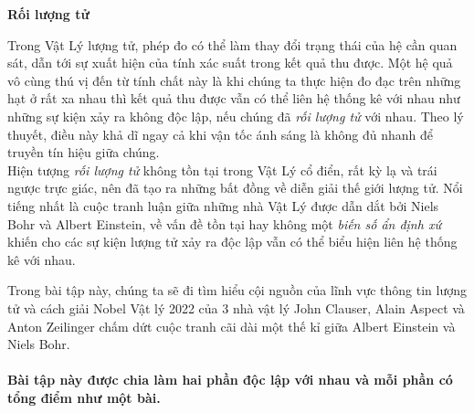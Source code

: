 
\textbf{Rối lượng tử}

Trong Vật Lý lượng tử, phép đo có thể làm thay đổi trạng thái của hệ cần quan sát, dẫn tới sự xuất hiện của tính xác suất trong kết quả thu được. Một hệ quả vô cùng thú vị đến từ tính chất này là khi chúng ta thực hiện đo đạc trên những hạt ở rất xa nhau thì kết quả thu được vẫn có thể liên hệ thống kê với nhau như những sự kiện xảy ra không độc lập, nếu chúng đã {\it rối lượng tử} với nhau. Theo lý thuyết, điều này khả dĩ ngay cả khi vận tốc ánh sáng là không đủ nhanh để truyền tín hiệu giữa chúng. \\
Hiện tượng {\it rối lượng tử} không tồn tại trong Vật Lý cổ điển, rất kỳ lạ và trái ngược trực giác, nên đã tạo ra những bất đồng về diễn giải thế giới lượng tử. Nổi tiếng nhất là cuộc tranh luận giữa những nhà Vật Lý được dẫn dắt bởi Niels Bohr và Albert Einstein, về vấn đề tồn tại hay không một {\it biến số ẩn định xứ} khiến cho các sự kiện lượng tử xảy ra độc lập vẫn có thể biểu hiện liên hệ thống kê với nhau.

Trong bài tập này, chúng ta sẽ đi tìm hiểu cội nguồn của lĩnh vực thông tin lượng tử và cách giải Nobel Vật lý 2022 của 3 nhà vật lý John Clauser, Alain Aspect và Anton Zeilinger chấm dứt cuộc tranh cãi dài một thế kỉ giữa Albert Einstein và Niels Bohr.\\ \\
\textbf{Bài tập này được chia làm hai phần độc lập với nhau và mỗi phần có tổng điểm như một bài.  }

